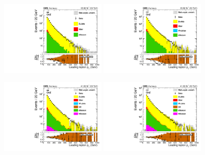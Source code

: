 \begin{figure}[htbp]
  \centering

  \includegraphics[width=0.45\textwidth]{figures/2016/AfterNormSF_Lepton_0_Pt_HNWR_SingleElectron_OnZ.pdf}
  \hspace{0.01\textwidth}
  \includegraphics[width=0.45\textwidth]{figures/2016/AfterNormSF_Lepton_0_Pt_HNWR_SingleMuon_OnZ.pdf}
  \vspace{0.01\textwidth}

  \includegraphics[width=0.45\textwidth]{figures/2017/AfterNormSF_Lepton_0_Pt_HNWR_SingleElectron_OnZ.pdf}
  \hspace{0.01\textwidth}
  \includegraphics[width=0.45\textwidth]{figures/2017/AfterNormSF_Lepton_0_Pt_HNWR_SingleMuon_OnZ.pdf}
  \vspace{0.01\textwidth}


\end{figure}
